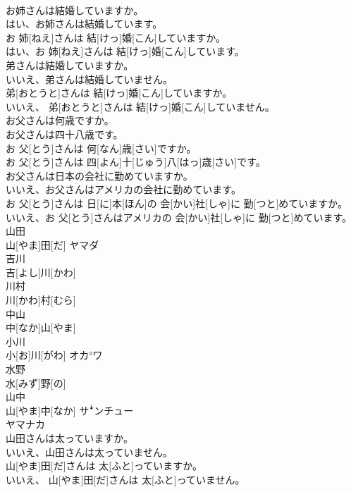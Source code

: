 \documentclass[8pt]{extreport}
\begin{document}
\begin{CJK}{UTF8}{min}
\\	お姉さんは結婚していますか。 
\\	はい、お姉さんは結婚しています。	
\\	お 姉[ねえ]さんは 結[けっ]婚[こん]していますか。 
\\	はい、お 姉[ねえ]さんは 結[けっ]婚[こん]しています。
\\	弟さんは結婚していますか。 
\\	いいえ、弟さんは結婚していません。	
\\	弟[おとうと]さんは 結[けっ]婚[こん]していますか。 
\\	いいえ、 弟[おとうと]さんは 結[けっ]婚[こん]していません。
\\	お父さんは何歳ですか。 
\\	お父さんは四十八歳です。	
\\	お 父[とう]さんは 何[なん]歳[さい]ですか。 
\\	お 父[とう]さんは 四[よん]十[じゅう]八[はっ]歳[さい]です。
\\	お父さんは日本の会社に勤めていますか。 
\\	いいえ、お父さんはアメリカの会社に勤めています。	
\\	お 父[とう]さんは 日[に]本[ほん]の 会[かい]社[しゃ]に 勤[つと]めていますか。 
\\	いいえ、お 父[とう]さんはアメリカの 会[かい]社[しゃ]に 勤[つと]めています。
\\	山田	
\\	山[やま]田[だ]	ヤマダ
\\	吉川	
\\	吉[よし]川[かわ]	
\\	川村	
\\	川[かわ]村[むら]	
\\	中山	
\\	中[なか]山[やま]
\\	小川	
\\	小[お]川[がわ]	オカ°ワ
\\	水野	
\\	水[みず]野[の]	
\\	山中	
\\	山[やま]中[なか]	サꜜンチュー 
\\	ヤマナカ
\\	山田さんは太っていますか。 
\\	いいえ、山田さんは太っていません。	
\\	山[やま]田[だ]さんは 太[ふと]っていますか。 
\\	いいえ、 山[やま]田[だ]さんは 太[ふと]っていません。

\end{CJK}
\end{document}
